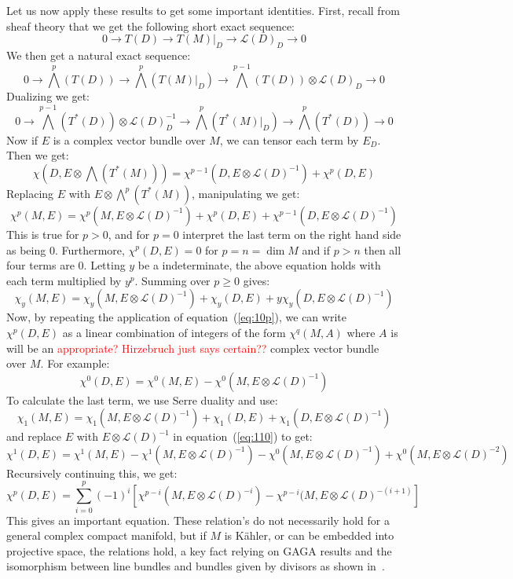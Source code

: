 \documentclass{book}
\newcommand{\CL}{{\mathcal{L}}}
\begin{document}
Let us now apply these results to get some important identities. First, recall from sheaf theory that we get
the following short exact sequence:
\[
  0 \to T(D) \to T(M)|_D \to \CL(D)_D \to 0
\]
We then get a natural exact sequence:
\[
0 \to \bigwedge^p\left(T(D)\right) \to \bigwedge^p(T(M)|_D) \to \bigwedge^{p-1}(T(D)) \otimes \CL(D)_D\to 0
\]
Dualizing we get:
\[
  0 \to \bigwedge^{p-1}(T^*(D))\otimes \CL(D)_D^{-1} \to \bigwedge^p(T^*(M)|_D) \to \bigwedge^p(T^*(D)) \to 0
\]
Now if $E$ is a complex vector bundle over $M$, we can tensor each term by $E_D$. Then we get:
\[
  \chi\left(D, E\otimes \bigwedge(T^*(M))\right) = \chi^{p-1}(D, E\otimes \CL(D)^{-1}) + \chi^p(D, E)
\]
Replacing $E$ with $E\otimes \bigwedge^p(T^*(M))$, manipulating we get:
\begin{equation}\label{eq:10p}
  \chi^p(M,E) = \chi^p(M, E\otimes \CL(D)^{-1}) + \chi^p(D, E) + \chi^{p-1}(D, E\otimes \CL(D)^{-1})
\end{equation}
This is true for $p>0$, and for $p=0$ interpret the last term on the right hand side as being $0$.
Furthermore, $\chi^p(D, E)=0$ for $p = n = \dim M$ and if $p > n$ then all four terms are $0$. Letting $y$ be
a indeterminate, the above equation holds with each term multiplied by $y^p$. Summing over $p\ge 0$ gives:
\[
  \chi_y(M,E) = \chi_y(M, E\otimes \CL(D)^{-1}) + \chi_y(D, E) + y\chi_y(D, E\otimes \CL(D)^{-1})
\]
Now, by repeating the application of equation~(\ref{eq:10p}), we can write $\chi^p(D,E)$ as a linear
combination of integers of the form $\chi^q(M, A)$ where $A$ is will be an  \textcolor{red}{appropriate?
Hirzebruch just says certain??} complex vector bundle over $M$. For example:
\begin{equation}\label{eq:110}
  \chi^0(D, E) = \chi^0(M,E) - \chi^0(M, E\otimes \CL(D)^{-1})
\end{equation}
To calculate the last term, we use Serre duality and use:
\[
  \chi_1(M,E) = \chi_1(M, E\otimes \CL(D)^{-1}) + \chi_1(D, E) + \chi_1(D, E\otimes \CL(D)^{-1})
\]
and replace $E$ with $E\otimes \CL(D)^{-1}$ in equation~(\ref{eq:110}) to get:
\[
  \chi^1(D,E) = \chi^1(M, E) - \chi^1(M, E\otimes \CL(D)^{-1}) - \chi^0(M, E\otimes \CL(D)^{-1}) + \chi^0(M,
  E\otimes \CL(D)^{-2})
\]
Recursively continuing this, we get:
\[
  \chi^p(D, E) = \sum_{i=0}^p (-1)^i [\chi^{p-i}(M, E\otimes \CL(D)^{-i}) - \chi^{p-i}(M, E\otimes
  \CL(D)^{-(i+1)}]
\]
This gives an important equation. These relation's do not necessarily hold for a general complex compact
manifold, but if $M$ is K\"ahler, or can be embedded into projective space, the relations hold, a key fact
relying on GAGA results and the isomorphism between line bundles and bundles given by divisors as shown
in~\cite{NateAlgGeo}.
\end{document}
